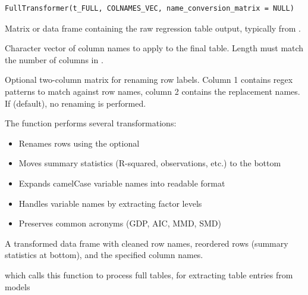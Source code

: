 \documentclass[a4paper]{book}
\begin{document}
%
\begin{Usage}
\begin{verbatim}
FullTransformer(t_FULL, COLNAMES_VEC, name_conversion_matrix = NULL)
\end{verbatim}
\end{Usage}
%
\begin{Arguments}
\begin{ldescription}
\item[\code{t\_FULL}] Matrix or data frame containing the raw regression table output,
typically from .

\item[\code{COLNAMES\_VEC}] Character vector of column names to apply to the final table.
Length must match the number of columns in .

\item[\code{name\_conversion\_matrix}] Optional two-column matrix for renaming row labels.
Column 1 contains regex patterns to match against row names,
column 2 contains the replacement names. If  (default), no
renaming is performed.
\end{ldescription}
\end{Arguments}
%
\begin{Details}
The function performs several transformations:
\begin{itemize}

\item{} Renames rows using the optional 
\item{} Moves summary statistics (R-squared, observations, etc.) to the bottom
\item{} Expands camelCase variable names into readable format
\item{} Handles  variable names by extracting factor levels
\item{} Preserves common acronyms (GDP, AIC, MMD, SMD)

\end{itemize}

\end{Details}
%
\begin{Value}
A transformed data frame with cleaned row names, reordered rows
(summary statistics at bottom), and the specified column names.
\end{Value}
%
\begin{SeeAlso}
 which calls this function to process full tables,
 for extracting table entries from models
\end{SeeAlso}
\end{document}
